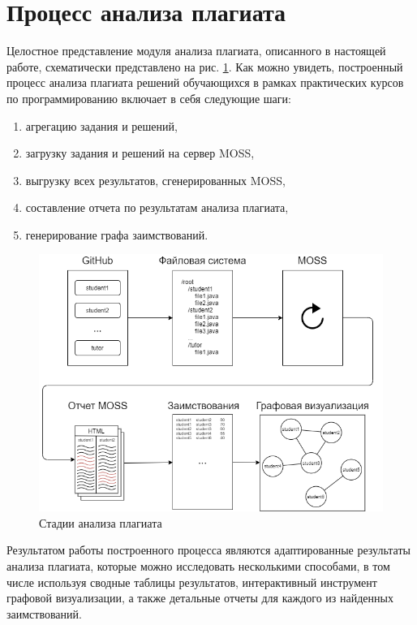 \documentclass[a4paper,14pt]{extarticle}
\begin{document}
\section{Процесс анализа плагиата}

Целостное представление модуля анализа плагиата, описанного в настоящей работе, схематически представлено на рис. \ref{fig:pipeline}. Как можно увидеть, построенный процесс анализа плагиата решений обучающихся в рамках практических курсов по программированию включает в себя следующие шаги:

\begin{enumerate}
    \item агрегацию задания и решений,
    \item загрузку задания и решений на сервер MOSS,
    \item выгрузку всех результатов, сгенерированных MOSS,
    \item составление отчета по результатам анализа плагиата,
    \item генерирование графа заимствований.
\end{enumerate}

\begin{figure}[h!]
\centering
\includegraphics[width=1.0\textwidth]{plagiarism_pipeline.png}
\caption{Стадии анализа плагиата}
\label{fig:pipeline}
\end{figure}

Результатом работы построенного процесса являются адаптированные результаты анализа плагиата, которые можно исследовать несколькими способами, в том числе используя сводные таблицы результатов, интерактивный инструмент графовой визуализации, а также детальные отчеты для каждого из найденных заимствований.
\end{document}

